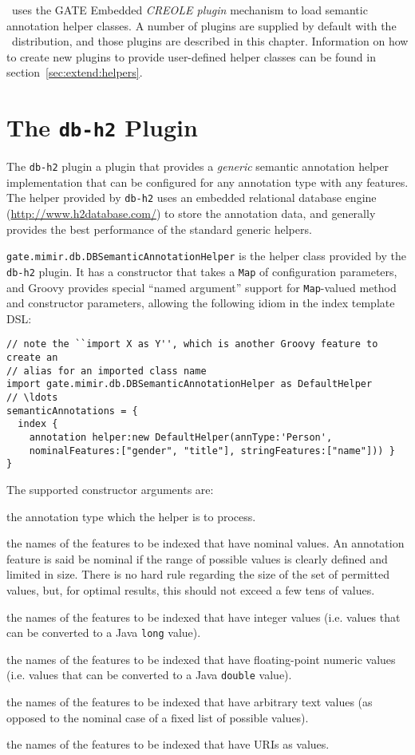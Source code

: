 \Mimir\ uses the GATE Embedded {\em CREOLE plugin} mechanism to load semantic
annotation helper classes.  A number of plugins are supplied by default with
the \Mimir\ distribution, and those plugins are described in this chapter.
Information on how to create new plugins to provide user-defined helper classes
can be found in section~\ref{sec:extend:helpers}.

\section{The {\tt db-h2} Plugin}\label{sec:plugins:db}

The {\tt db-h2} plugin a plugin that provides a {\em generic} semantic
annotation helper implementation that can be configured for any annotation type
with any features.  The helper provided by {\tt db-h2} uses an embedded
relational database engine (\url{http://www.h2database.com/}) to store the
annotation data, and generally provides the best performance of the standard
generic helpers.

\lstinline!gate.mimir.db.DBSemanticAnnotationHelper! is the helper class
provided by the {\tt db-h2} plugin.  It has a constructor that takes a
{\tt Map} of configuration parameters, and Groovy provides special ``named
argument'' support for {\tt Map}-valued method and constructor parameters,
allowing the following idiom in the index template DSL:
\begin{lstlisting}[texcl, breaklines, breakindent=150pt]
// note the ``import X as Y'', which is another Groovy feature to create an
// alias for an imported class name
import gate.mimir.db.DBSemanticAnnotationHelper as DefaultHelper
// \ldots
semanticAnnotations = {
  index {
    annotation helper:new DefaultHelper(annType:'Person',
    nominalFeatures:["gender", "title"], stringFeatures:["name"])) }
}
\end{lstlisting}

The supported constructor arguments are:
\bde
\item[annType:] the annotation type which the helper is to process.
\item[nominalFeatures:] the names of the features to be indexed that have
  nominal values. An annotation feature is said be nominal if the range of
  possible values is clearly defined and limited in size. There is no hard rule
  regarding the size of the set of permitted values, but, for optimal results,
  this should not exceed a few tens of values.
\item[integerFeatures:] the names of the features to be indexed that have
  integer values (i.e. values that can be converted to a Java {\tt long}
  value).
\item[floatFeatures:] the names of the features to be indexed that have
  floating-point numeric values (i.e. values that can be converted to a Java
  {\tt double} value).
\item[textFeatures:] the names of the features to be indexed that have
  arbitrary text values (as opposed to the nominal case of a fixed list of
  possible values).
\item[uriFeatures:] the names of the features to be indexed that have
  URIs as values.
\ede

